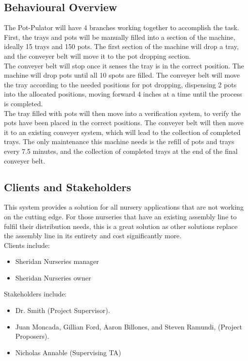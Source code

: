 \documentclass[12pt]{article}
\begin{document}
\subsection{Behavioural Overview}
The Pot-Pulator will have 4 branches working together to accomplish the task. First, the trays and pots will be manually filled into a section of the machine, ideally 15 trays and 150 pots. The first section of the machine will drop a tray, and the conveyer belt will move it to the pot dropping section. \\

\noindent The conveyer belt will stop once it senses the tray is in the correct position. The machine will drop pots until all 10 spots are filled. The conveyer belt will move the tray according to the needed positions for pot dropping, dispensing 2 pots into the allocated positions, moving forward 4 inches at a time until the process is completed. \\

\noindent The tray filled with pots will then move into a verification system, to verify the pots have been placed in the correct positions. The conveyer belt will then move it to an existing conveyer system, which will lead to the collection of completed trays. The only maintenance this machine needs is the refill of pots and trays every 7.5 minutes, and the collection of completed trays at the end of the final conveyer belt. \\

\subsection{Clients and Stakeholders}
\noindent This system provides a solution for all nursery applications that are not 
working on the cutting edge. For those nurseries that have an existing assembly line 
to fulfil their distribution needs, this is a great solution as other solutions replace the 
assembly line in its entirety and cost significantly more.\\

\noindent Clients include:
\begin{itemize}
    \item Sheridan Nurseries manager
    \item Sheridan Nurseries owner
\end{itemize}
\noindent Stakeholders include:
\begin{itemize}
    \item Dr. Smith (Project Supervisor).
    \item Juan Moncada, Gillian Ford, Aaron Billones, and Steven Ramundi, (Project Proposers).
    \item Nicholas Annable (Supervising TA)
    
\end{itemize}
\end{document}
